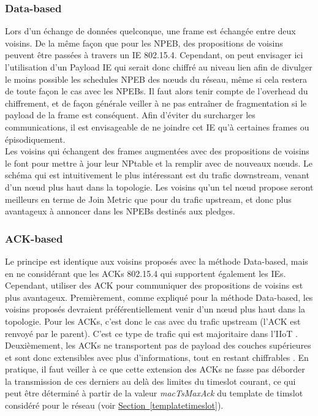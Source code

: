 \documentclass[]{report}
\newcommand{\wordlink}[2]{\hyperref[#2]{#1~\ref{#2}}}
\begin{document}
\subsubsection{Data-based}

Lors d'un échange de données quelconque, une frame est échangée entre deux voisins. De la même façon que pour les NPEB, des propositions de voisins peuvent être passées à travers un IE 802.15.4. Cependant, on peut envisager ici l'utilisation d'un Payload IE qui serait donc chiffré au niveau lien afin de divulger le moins possible les schedules NPEB des nœuds du réseau, même si cela restera de toute façon le cas avec les NPEBs. Il faut alors tenir compte de l'overhead du chiffrement, et de façon générale veiller à ne pas entraîner de fragmentation si le payload de la frame est conséquent. Afin d'éviter du surcharger les communications, il est envisageable de ne joindre cet IE qu'à certaines frames ou épisodiquement.\\

Les voisins qui échangent des frames augmentées avec des propositions de voisins le font pour mettre à jour leur NPtable et la remplir avec de nouveaux nœuds. Le schéma qui est intuitivement le plus intéressant est du trafic downstream, venant d'un nœud plus haut dans la topologie. Les voisins qu'un tel nœud propose seront meilleurs en terme de Join Metric que pour du trafic upstream, et donc plus avantageux à annoncer dans les NPEBs destinés aux pledges.

\subsubsection{ACK-based}

Le principe est identique aux voisins proposés avec la méthode Data-based, mais en ne considérant que les ACKs 802.15.4 qui supportent également les IEs. Cependant, utiliser des ACK pour communiquer des propositions de voisins est plus avantageux. Premièrement, comme expliqué pour la méthode Data-based, les voisins proposés devraient préférentiellement venir d'un nœud plus haut dans la topologie. Pour les ACKs, c'est donc le cas avec du trafic upstream (l'ACK est renvoyé par le parent). C'est ce type de trafic qui est majoritaire dans l'IIoT \cite{openbenchmark}. Deuxièmement, les ACKs ne transportent pas de payload des couches supérieures et sont donc extensibles avec plus d'informations, tout en restant chiffrables \cite{IEEE802.15.4}. En pratique, il faut veiller à ce que cette extension des ACKs ne fasse pas déborder la transmission de ces derniers au delà des limites du timeslot courant, ce qui peut être déterminé à partir de la valeur \textit{macTsMaxAck} du template de timslot considéré pour le réseau (voir \wordlink{Section}{templatetimeslot}).
\end{document}
